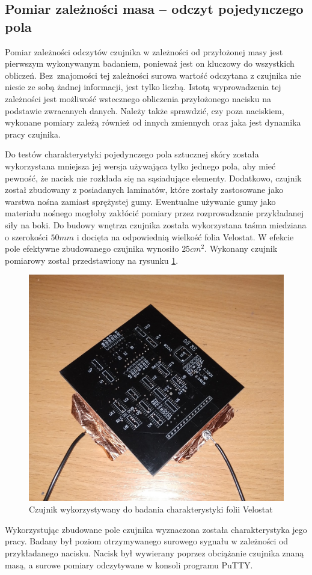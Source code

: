 \subsection{Pomiar zależności masa -- odczyt pojedynczego pola}
\label{ss_badanie_hiperbola}

Pomiar zależności odczytów czujnika w zależności od przyłożonej masy jest pierwszym wykonywanym badaniem, ponieważ jest on kluczowy do wszystkich obliczeń. Bez~znajomości tej zależności surowa wartość odczytana z czujnika nie niesie ze sobą żadnej informacji, jest tylko liczbą. Istotą wyprowadzenia tej zależności jest możliwość wstecznego obliczenia przyłożonego nacisku na podstawie zwracanych danych. Należy także sprawdzić, czy poza naciskiem, wykonane pomiary zależą również od innych zmiennych oraz jaka jest dynamika pracy czujnika.

Do testów charakterystyki pojedynczego pola sztucznej skóry została wykorzystana mniejsza jej wersja używająca tylko jednego pola, aby mieć pewność, że nacisk nie rozkłada się na sąsiadujące elementy. Dodatkowo, czujnik został zbudowany z posiadanych laminatów, które zostały zastosowane jako warstwa nośna zamiast sprężystej gumy. Ewentualne używanie gumy jako materiału nośnego mogłoby zakłócić pomiary przez rozprowadzanie przykładanej siły na boki. Do budowy wnętrza czujnika została wykorzystana taśma miedziana o szerokości $50 mm$ i docięta na odpowiednią wielkość folia Velostat. W efekcie pole efektywne zbudowanego czujnika wynosiło $25 cm^2$. Wykonany czujnik pomiarowy został przedstawiony na rysunku \ref{f_badanie_1_czujnik}.

\begin{figure}[!h]
\centering
\includegraphics[width=0.5\linewidth]{img/badanie_1_czujnik.jpg}
\caption{Czujnik wykorzystywany do badania charakterystyki folii Velostat}
\label{f_badanie_1_czujnik}
\end{figure}

Wykorzystując zbudowane pole czujnika wyznaczona została charakterystyka jego pracy. Badany był poziom otrzymywanego surowego sygnału w zależności od przykładanego nacisku. Nacisk był wywierany poprzez obciążanie czujnika znaną masą, a surowe pomiary odczytywane w konsoli programu PuTTY.

